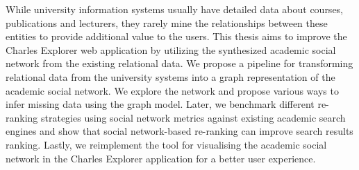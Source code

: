 \documentclass[12pt]{report}
\begin{document}

While university information systems usually have detailed data about courses, publications and lecturers, 
they rarely mine the relationships between these entities to provide additional value to the users.
This thesis aims to improve the Charles Explorer web application by utilizing the synthesized academic social network from the existing relational data.
We propose a pipeline for transforming relational data from the university systems into a graph representation of the academic social network. 
We explore the network and propose various ways to infer missing data using the graph model. 
Later, we benchmark different re-ranking strategies using social network metrics against existing academic search engines and show that social network-based re-ranking can improve search results ranking.
Lastly, we reimplement the tool for visualising the academic social network in the Charles Explorer application for a better user experience.
\end{document}
